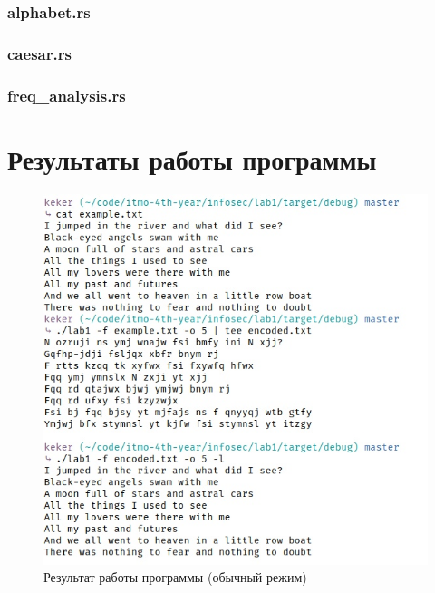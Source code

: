 \documentclass[12pt, a4paper]{article}
\begin{document}
\subsubsection*{alphabet.rs}



\subsubsection*{caesar.rs}



\subsubsection*{freq\_analysis.rs}



\section*{Результаты работы программы}

\begin{figure}[h]
    \includegraphics[scale = 0.55]{res1}
    \caption{Результат работы программы (обычный режим)}
    \centering
\end{figure}
\end{document}
